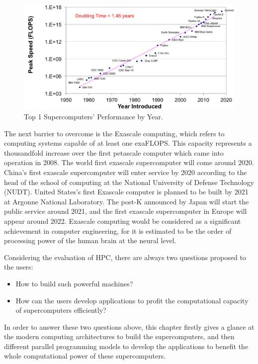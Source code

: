 \begin{figure}[htbp]
	\centering
	\includegraphics[width=6.3in]{fig/sc_evaluate.pdf}
	\caption{Top 1 Supercomputers' Performance by Year.}
		\label{sc_evaluate}
\end{figure}

The next barrier to overcome is the Exascale computing, which refers to computing systems capable of at least one exaFLOPS. This capacity represents a thousandfold increase over the first petascale computer which came into operation in 2008. The world first exascale supercomputer will come around 2020. China's first exascale supercomputer will enter service by 2020 according to the head of the school of computing at the National University of Defense Technology (NUDT). United States's first Exascale computer is planned to be built by 2021 at Argonne National Laboratory. The post-K announced by Japan will start the public service around 2021, and the first exascale supercomputer in Europe will appear around 2022. Exascale computing would be considered as a significant achievement in computer engineering, for it is estimated to be the order of processing power of the human brain at the neural level.

Considering the evaluation of HPC, there are always two questions proposed to the users:

\begin{itemize}
	\item How to build such powerful machines?
	\item How can the users develop applications to profit the computational capacity of supercomputers efficiently?
\end{itemize}

In order to answer these two questions above, this chapter firstly gives a glance at the modern computing architectures to build the supercomputers, and then different parallel programming models to develop the applications to benefit the whole computational power of these supercomputers.


